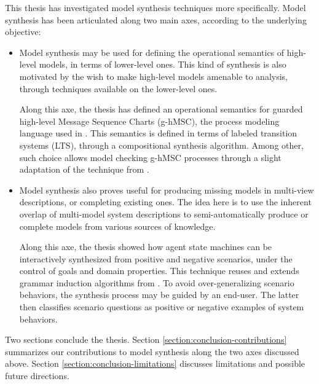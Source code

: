 This thesis has investigated model synthesis techniques more specifically. Model synthesis has been articulated along two main axes, according to the underlying objective:
\begin{itemize}
\item Model synthesis may be used for defining the operational semantics of high-level models, in terms of lower-level ones. This kind of synthesis is also motivated by the wish to make high-level models amenable to analysis, through techniques available on the lower-level ones.

Along this axe, the thesis has defined an operational semantics for guarded high-level Message Sequence Charts (g-hMSC), the process modeling language used in \cite{Damas:2011}. This semantics is defined in terms of labeled transition systems (LTS), through a compositional synthesis algorithm. Among other, such choice allows model checking g-hMSC processes through a slight adaptation of the technique from \cite{Giannakopoulou:2003}.

\item Model synthesis also proves useful for producing missing models in multi-view descriptions, or completing existing ones. The idea here is to use the inherent overlap of multi-model system descriptions to semi-automatically produce or complete models from various sources of knowledge.

Along this axe, the thesis showed how agent state machines can be interactively synthesized from positive and negative scenarios, under the control of goals and domain properties. This technique reuses and extends grammar induction algorithms from \cite{Oncina:1992, Lang:1998}. To avoid over-generalizing scenario behaviors, the synthesis process may be guided by an end-user. The latter then classifies scenario questions as positive or negative examples of system behaviors.
\end{itemize}

Two sections conclude the thesis. Section \ref{section:conclusion-contributions} summarizes our contributions to model synthesis along the two axes discussed above. Section \ref{section:conclusion-limitations} discusses limitations and possible future directions. 



